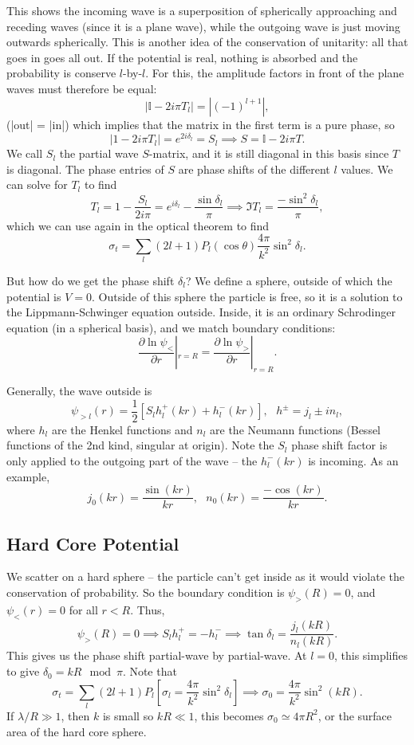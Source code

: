 \documentclass[fontsize=12pt]{scrartcl}
\newcommand{\bb}[1]{\mathbb{#1}}
\newcommand{\Id}{\bb{I}}
\newcommand{\ptl}{\partial}
\begin{document}
This shows the incoming wave is a superposition of spherically approaching and receding waves (since it is a plane wave), while the outgoing wave is just moving outwards spherically. This is another idea of the conservation of unitarity: all that goes in goes all out. If the potential is real, nothing is absorbed and the probability is conserve $l$-by-$l$. For this, the amplitude factors in front of the plane waves must therefore be equal: $$|\Id-2i\pi T_l| = |(-1)^{l+1}|,$$ (|out| = |in|) which implies that the matrix in the first term is a pure phase, so $$|1-2i\pi T_l|=e^{2i\delta_l} = S_l \implies S=\Id - 2i\pi T.$$ We call $S_l$ the partial wave $S$-matrix, and it is still diagonal in this basis since $T$ is diagonal. The phase entries of $S$ are phase shifts of the different $l$ values. We can solve for $T_l$ to find $$T_l=1-\frac{S_l}{2i\pi} = e^{i\delta_l} - \frac{\sin\delta_l}{\pi}\implies \Im T_l = \frac{-\sin^2\delta_l}{\pi},$$ which we can use again in the optical theorem to find $$\sigma_t = \sum_l (2l+1)P_l(\cos\theta) \frac{4\pi}{k^2}\sin^2\delta_l.$$

But how do we get the phase shift $\delta_l$? We define a sphere, outside of which the potential is $V=0$. Outside of this sphere the particle is free, so it is a solution to the Lippmann-Schwinger equation outside. Inside, it is an ordinary Schrodinger equation (in a spherical basis), and we match boundary conditions: $$\frac{\ptl \ln\psi_<}{\ptl r}|_{r=R} = \frac{\ptl\ln\psi_>}{\ptl r}|_{r=R}.$$

Generally, the wave outside is $$\psi_{> l}(r) = \frac{1}{2}\left[S_lh_l^+(kr) + h_l^-(kr)\right], \ \ \ h^\pm = j_l\pm i n_l,$$ where $h_l$ are the Henkel functions and $n_l$ are the Neumann functions (Bessel functions of the 2nd kind, singular at origin). Note the $S_l$ phase shift factor is only applied to the outgoing part of the wave -- the $h_l^-(kr)$ is incoming. As an example, $$j_0(kr) = \frac{\sin(kr)}{kr}, \ \ \ n_0(kr)=\frac{-\cos(kr)}{kr}.$$ 

\subsection{Hard Core Potential}

We scatter on a hard sphere -- the particle can't get inside as it would violate the conservation of probability. So the boundary condition is $\psi_>(R)=0$, and $\psi_<(r)=0$ for all $r<R$. Thus, $$\psi_>(R)=0\implies S_lh_l^+ = -h_l^-\implies \tan\delta_l=\frac{j_l(kR)}{n_l(kR)}.$$ This gives us the phase shift partial-wave by partial-wave. At $l=0$, this simplifies to give $\delta_0=kR\mod\pi$. Note that $$\sigma_t=\sum_l(2l+1)P_l\left[\sigma_l = \frac{4\pi}{k^2}\sin^2\delta_l\right]\implies \sigma_0=\frac{4\pi}{k^2}\sin^2(kR).$$ If $\lambda/R\gg 1$, then $k$ is small so $kR\ll 1$, this becomes $\sigma_0\simeq 4\pi R^2$, or the surface area of the hard core sphere.
\end{document}
